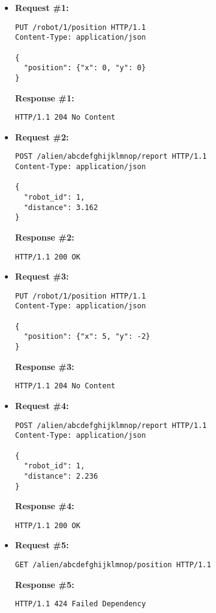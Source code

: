 \newpage
\begin{itemize}
\item  %
\textbf{Request \#1:}
\begin{lstlisting}[xleftmargin=1pc,numbers=none]
PUT /robot/1/position HTTP/1.1
Content-Type: application/json

{
  "position": {"x": 0, "y": 0}
}
\end{lstlisting}
\textbf{Response \#1:}
\begin{lstlisting}[xleftmargin=1pc,numbers=none]
HTTP/1.1 204 No Content
\end{lstlisting}

\item  %
\textbf{Request \#2:}
\begin{lstlisting}[xleftmargin=1pc,numbers=none]
POST /alien/abcdefghijklmnop/report HTTP/1.1
Content-Type: application/json

{
  "robot_id": 1,
  "distance": 3.162
}
\end{lstlisting}
\textbf{Response \#2:}
\begin{lstlisting}[xleftmargin=1pc,numbers=none]
HTTP/1.1 200 OK
\end{lstlisting}

\item  %
\textbf{Request \#3:}
\begin{lstlisting}[xleftmargin=1pc,numbers=none]
PUT /robot/1/position HTTP/1.1
Content-Type: application/json

{
  "position": {"x": 5, "y": -2}
}
\end{lstlisting}
\textbf{Response \#3:}
\begin{lstlisting}[xleftmargin=1pc,numbers=none]
HTTP/1.1 204 No Content
\end{lstlisting}

\item  %
\textbf{Request \#4:}
\begin{lstlisting}[xleftmargin=1pc,numbers=none]
POST /alien/abcdefghijklmnop/report HTTP/1.1
Content-Type: application/json

{
  "robot_id": 1,
  "distance": 2.236
}
\end{lstlisting}
\textbf{Response \#4:}
\begin{lstlisting}[xleftmargin=1pc,numbers=none]
HTTP/1.1 200 OK
\end{lstlisting}

\newpage
\item  %
\textbf{Request \#5:}
\begin{lstlisting}[xleftmargin=1pc,numbers=none]
GET /alien/abcdefghijklmnop/position HTTP/1.1
\end{lstlisting}
\textbf{Response \#5:}
\begin{lstlisting}[xleftmargin=1pc,numbers=none]
HTTP/1.1 424 Failed Dependency
\end{lstlisting}


\end{itemize}
